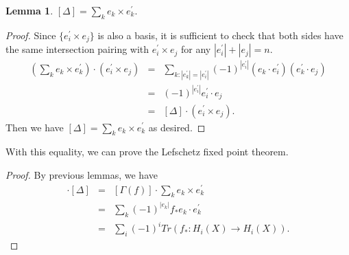 \documentclass[psamsfonts]{amsart}
\newtheorem{lem}[theorem]{Lemma}
\theoremstyle{definition}
\theoremstyle{remark}
\numberwithin{equation}{section}
\begin{document}
		\begin{lem}
			$[\Delta] = \sum_k e_k \times e_k^\prime .$
		\end{lem}
		\begin{proof}
			Since $\{ e_i^\prime \times e_j \}$ is also a basis, it is sufficient to check that both sides have the same intersection pairing with $e_i^\prime \times e_j$ for any $|e_i^\prime|+ |e_j| = n$.
			\begin{eqnarray}
				(\sum_k e_k \times e_k^\prime) \cdot (e_i^\prime \times e_j) &=& \sum_{k:|e_k^\prime| = |e_i^\prime|} (-1)^{|e_i^\prime|} (e_k \cdot e_i^\prime)(e_k^\prime \cdot e_j) \\
				&=& (-1)^{|e_i^\prime|} e_i^\prime \cdot e_j \\
				&=& [\Delta] \cdot (e_i^\prime \times e_j).
			\end{eqnarray}
			Then we have $[\Delta] = \sum_k e_k \times e_k^\prime$ as desired.
		\end{proof}
		
		With this equality, we can prove the Lefschetz fixed point theorem.
		\begin{proof}
			By previous lemmas, we have
			\begin{eqnarray}
				[\Gamma(f)] \cdot [\Delta] &=& [\Gamma(f)] \cdot \sum_k e_k \times e_k^\prime \\
				&=& \sum_k (-1)^{|e_k|} f_* e_k \cdot e_k^\prime \\
				&=& \sum_i (-1)^i Tr(f_*: H_i(X) \to H_i(X)).
			\end{eqnarray}
		\end{proof}
		
		
\end{document}
